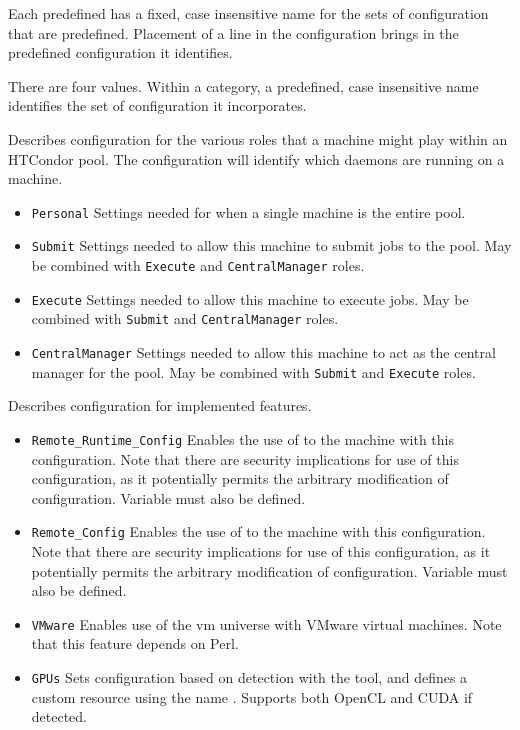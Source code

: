 Each predefined  has a fixed, case insensitive
name for the sets of configuration that are predefined. 
Placement of a  line in the configuration brings in
the predefined configuration it identifies.

There are four  values.
Within a category, a predefined, case insensitive name identifies
the set of configuration it incorporates. 
\begin{description}

\label{usecategory:ROLE}
\item[\MacroNI{ROLE}]
  Describes configuration for the various roles that a machine might
  play within an HTCondor pool. The configuration will identify which
  daemons are running on a machine.
  \begin{itemize}
    \item \texttt{Personal}
    Settings needed for when a single machine is the entire pool.
    \item \texttt{Submit}
    Settings needed to allow this machine to submit jobs to the pool.
    May be combined with \texttt{Execute} and \texttt{CentralManager} roles.
    \item \texttt{Execute}
    Settings needed to allow this machine to execute jobs.
    May be combined with \texttt{Submit} and \texttt{CentralManager} roles.
    \item \texttt{CentralManager}
    Settings needed to allow this machine to act as the central manager
    for the pool.
    May be combined with \texttt{Submit} and \texttt{Execute} roles.
  \end{itemize}

\label{usecategory:FEATURE}
\item[\MacroNI{FEATURE}]
  Describes configuration for implemented features. 
  \begin{itemize}
    \item \texttt{Remote\_Runtime\_Config}
    Enables the use of   to the machine with
    this configuration.
    Note that there are security implications for use of this configuration,
    as it potentially permits the arbitrary modification of configuration.
    Variable  must also be defined.
    \item \texttt{Remote\_Config}
    Enables the use of   to the machine with
    this configuration.
    Note that there are security implications for use of this configuration,
    as it potentially permits the arbitrary modification of configuration.
    Variable  must also be defined.
    \item \texttt{VMware}
    Enables use of the vm universe with VMware virtual machines.
    Note that this feature depends on Perl. 
    \item \texttt{GPUs}
    Sets configuration based on detection with the 
    tool, and defines a custom resource using the name .
    Supports both OpenCL and CUDA if detected. 
  \end{itemize}


\end{description}
